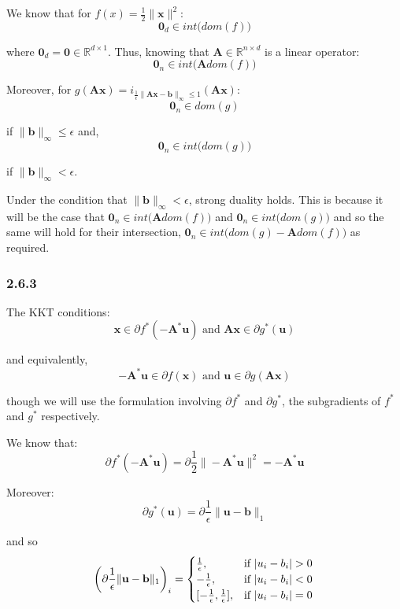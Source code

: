 \documentclass[12pt]{article}
\begin{document}
We know that for $f(x) = \frac{1}{2}\|\textbf{x}\|^2$:
\[\textbf{0}_d \in int \big(dom(f)\big)\]

where $\textbf{0}_d = \textbf{0} \in \mathbb{R}^{d \times 1}$. Thus, knowing that $\textbf{A} \in \mathbb{R}^{n\times d}$ is a linear operator:
\[\textbf{0}_n \in int \big(\textbf{A} dom(f)\big)\]

Moreover, for $g(\textbf{Ax}) =  i_{\frac{1}{\epsilon}\|\textbf{Ax} - \textbf{b}\|_{\infty} \leq 1}\left(\textbf{Ax}\right)$:
\[\textbf{0}_n \in dom(g)\]

if $\|\textbf{b}\|_{\infty} \leq \epsilon$ and,
\[\textbf{0}_n \in int \big(dom(g)\big)\]

if $\|\textbf{b}\|_{\infty} < \epsilon$.

Under the condition that $\|\textbf{b}\|_{\infty} < \epsilon$, strong duality holds. This is because it will be the case that $\textbf{0}_n \in int \big(\textbf{A} dom(f)\big)$ and $\textbf{0}_n \in int \big(dom(g)\big)$ and so the same will hold for their intersection, $\textbf{0}_n \in int \big(dom(g) - \textbf{A}dom(f)\big)$ as required.

\subsubsection*{2.6.3}

The KKT conditions:
\[\textbf{x} \in \partial f^*(-\textbf{A}^*\textbf{u}) \text{ and } \textbf{Ax} \in \partial g^*(\textbf{u})\]

and equivalently,
\[-\textbf{A}^*\textbf{u} \in \partial f(\textbf{x}) \text{ and } \textbf{u} \in \partial g(\textbf{Ax})\]

though we will use the formulation involving $\partial f^*$ and $\partial g^*$, the subgradients of $f^*$ and $g^*$ respectively.

We know that:
\[\partial f^*(-\textbf{A}^*\textbf{u}) = \partial \frac{1}{2}\|-\textbf{A}^*\textbf{u}\|^2 = -\textbf{A}^*\textbf{u}\]

Moreover:
\[\partial g^*(\textbf{u}) = \partial\frac{1}{\epsilon} \| \textbf{u} - \textbf{b}\|_1 \]

and so
\[\left(\partial \frac{1}{\epsilon}\| \textbf{u} - \textbf{b}\|_1\right)_i = \begin{cases}
      \frac{1}{\epsilon}, &  \text{if } | u_i - b_i| > 0 \\
      -\frac{1}{\epsilon}, &  \text{if } | u_i - b_i| < 0 \\
      [-\frac{1}{\epsilon}, \frac{1}{\epsilon}], &  \text{if } | u_i - b_i| = 0 \\
   \end{cases} \\
\]
\end{document}
